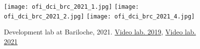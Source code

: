   \begin{figure}
      \begin{center}
         \texttt{[image: ofi\_dci\_brc\_2021\_1.jpg]}
         \texttt{[image: ofi\_dci\_brc\_2021\_2.jpg]}
         \texttt{[image: ofi\_dci\_brc\_2021\_4.jpg]}
      \end{center}
      \caption{Development lab at Bariloche, 2021. \href{\linkofidci}{Video lab. 2019}, \href{\linkofidcitwentyone}{Video lab. 2021}}
      \label{fig:ofi_dci}
   \end{figure}
\pagebreak
